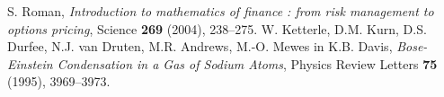 \documentclass[twoside,11pt]{article}
\begin{document}
\begin{thebibliography}{99}

 S. Roman, \emph{Introduction to mathematics of finance : from risk management to options pricing}, Science \textbf{269} (2004), 238--275. 
 W. Ketterle, D.M. Kurn, D.S. Durfee, N.J. van Druten, M.R. Andrews, M.-O. Mewes in K.B. Davis, \emph{Bose-Einstein Condensation in a Gas of Sodium Atoms}, Physics Review Letters \textbf{75} (1995), 3969--3973. 


\end{thebibliography}
\end{document}
